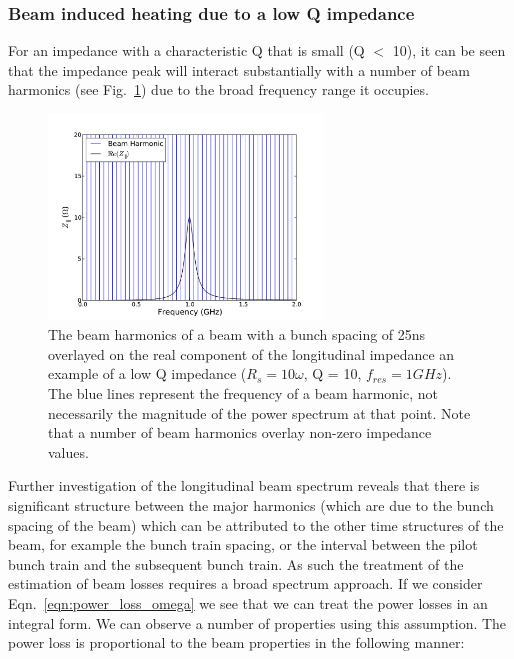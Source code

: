 \subsubsection{Beam induced heating due to a low Q impedance}

For an impedance with a characteristic Q that is small (Q $<$ 10), it can be seen that the impedance peak will interact substantially with a number of beam harmonics (see Fig.~\ref{fig:low_q_harmonics}) due to the broad frequency range it occupies.

\begin{figure}
\begin{center}
\includegraphics[width=0.65\textwidth]{Wakefields_and_Impedances/figures/low_q_10_resonance_beam_harmonics.pdf}
\end{center}
\caption{The beam harmonics of a beam with a bunch spacing of 25ns overlayed on the real component of the longitudinal impedance an example of a low Q impedance ($R_{s}=10\omega$, Q = 10, $f_{res}=1GHz$). The blue lines represent the frequency of a beam harmonic, not necessarily the magnitude of the power spectrum at that point. Note that a number of beam harmonics overlay non-zero impedance values.}
\label{fig:low_q_harmonics}
\end{figure}

Further investigation of the longitudinal beam spectrum reveals that there is significant structure between the major harmonics (which are due to the bunch spacing of the beam) which can be attributed to the other time structures of the beam, for example the bunch train spacing, or the interval between the pilot bunch train and the subsequent bunch train. As such the treatment of the estimation of beam losses requires a broad spectrum approach. If we consider Eqn.~\ref{eqn:power_loss_omega} we see that we can treat the power losses in an integral form. We can observe a number of properties using this assumption. The power loss is proportional to the beam properties in the following manner:

